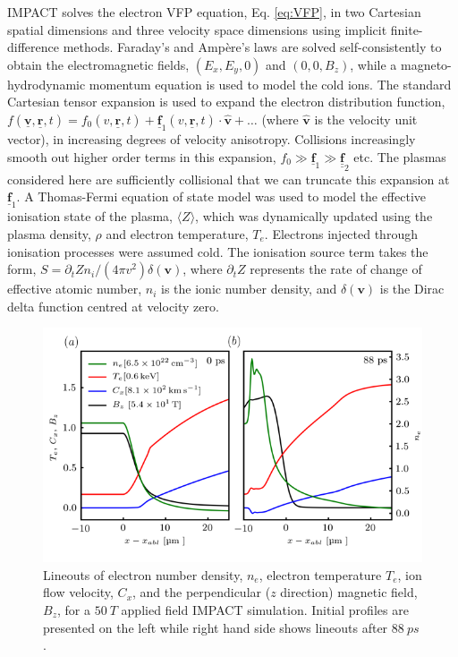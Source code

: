 \documentclass[aip,reprint]{revtex4-1}
\newcommand*{\dbul}[1]{%
	\underline{\underline{ #1}}
}
\newcommand*{\myvec}[1]{
	\mathbf{\underline{#1}}}
\begin{document}
 IMPACT solves the electron VFP equation, Eq. \ref{eq:VFP}, in two Cartesian spatial dimensions and three velocity space dimensions using implicit finite-difference methods. Faraday's  and Amp\`ere's laws are solved self-consistently to obtain the electromagnetic fields, $(E_x, E_y,0)$ and $(0,0,B_z)$, while a magneto-hydrodynamic momentum equation is used to model the cold ions. The standard Cartesian tensor expansion \cite{Shkarovsky1966} is used  to expand the electron distribution function, $f(\myvec{v},\myvec{r},t) = f_0(v,\myvec{r},t) + \myvec{f}_1(v,\myvec{r},t) \cdot \hat{\mathbf{v}} + \dots$ (where $\hat{\mathbf{v}}$ is the velocity unit vector), in increasing degrees of velocity anisotropy. Collisions increasingly smooth out higher order terms in this expansion, $f_0 \gg \myvec{f}_1 \gg \dbul{\mathbf{f}}_2$ etc. The plasmas considered here are sufficiently collisional that we can truncate this expansion at $\mathbf{\myvec{f}}_1$. 
%
A Thomas-Fermi equation of state model was used to model the effective ionisation state of the plasma, $\langle Z \rangle$, which was dynamically updated using the plasma density, $\rho$ and electron temperature, $T_e$. Electrons injected through ionisation processes were assumed cold. The ionisation source term takes the form, $S= \partial_t Z n_i/( 4\pi v^2) \delta (\mathbf{v})$, where $\partial_t Z$ represents the rate of change of effective atomic number, $n_i$ is the ionic number density, and $\delta(\mathbf{v}) $ is the Dirac delta function centred at velocity zero. 


\begin{figure}
\includegraphics[width=1.0\columnwidth]{pics/one_dim_2col15.png}%
\caption{\label{fig:1Dprof} Lineouts of electron number density, $n_e$, electron temperature $T_e$, ion flow velocity, $C_x$, and the perpendicular ($z$ direction) magnetic field, $B_z$, for a $\SI{50}{T}$ applied field IMPACT simulation. Initial profiles are presented on the left while right hand side shows lineouts after $\SI{88}{ps}$. }%
\end{figure}
\end{document}
